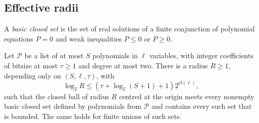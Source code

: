 \subsection{Effective radii}
A \emph{basic closed set} is the set of real solutions of a finite
conjunction of polynomial equations $P=0$ and weak inequalities $P\le0$
or $P\ge0$.

\begin{lemma}\label{lem:radii}
Let $\mathcal P$ be a list of at most $S$ polynomials in $\ell$
variables, with integer coefficients of bitsize at most $\tau\ge1$ and
degree at most two. There is a radius $R\ge1$, depending only on
$(S,\ell,\tau)$, with
\begin{equation}\label{eq:radius}
 \log_2 R\le(\tau+\log_2(S+1)+1)2^{O(\ell)},
\end{equation}
such that the closed ball of radius $R$ centred at the origin meets
every nonempty basic closed set defined by polynomials from $\mathcal P$
and contains every such set that is bounded. The same holds for finite
unions of such sets.
\end{lemma}
